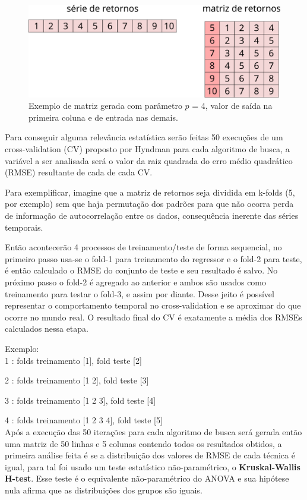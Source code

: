 \documentclass[preprint,12pt]{elsarticle}
\begin{document}
\begin{figure}[h]
	\centering\includegraphics[width=0.8\linewidth]{g4145}
	\caption{Exemplo de matriz gerada com parâmetro $p$ = 4, valor de saída na primeira coluna e de entrada nas demais.}
\end{figure}


Para conseguir alguma relevância estatística serão feitas 50 execuções de um cross-validation (CV) proposto por Hyndman \cite{hyndman} para cada algoritmo de busca, a variável a ser analisada será o valor da raiz quadrada do erro médio quadrático (RMSE) resultante de cada  de cada CV.

Para exemplificar, imagine que a matriz de retornos seja dividida em k-folds (5, por exemplo) sem que haja permutação dos padrões para que não ocorra perda de informação de autocorrelação entre os dados, consequência inerente das séries temporais. 

Então acontecerão 4 processos de treinamento/teste de forma sequencial, no primeiro passo usa-se o fold-1 para treinamento do regressor e o fold-2 para teste, é então calculado o RMSE do conjunto de teste e seu resultado é salvo. No próximo passo o fold-2 é agregado ao anterior e ambos são usados como treinamento para testar o fold-3, e assim por diante. Desse jeito é possível representar o comportamento temporal no cross-validation e se aproximar do que ocorre no mundo real. O resultado final do CV é exatamente a média dos RMSEs calculados nessa etapa.

Exemplo:\\

1 : folds treinamento [1], fold teste [2]

2 : folds treinamento [1 2], fold teste [3] 

3 : folds treinamento [1 2 3], fold teste [4] 

4 : folds treinamento [1 2 3 4], fold teste [5] \\



Após a execução das 50 iterações para cada algoritmo de busca será gerada então uma matriz de 50 linhas e 5 colunas contendo todos os resultados obtidos, a primeira análise feita é se a distribuição dos valores de RMSE de cada técnica é igual, para tal foi usado um teste estatístico não-paramétrico, o \textbf{Kruskal-Wallis H-test}. Esse teste é o equivalente não-paramétrico do ANOVA e sua hipótese nula afirma que as distribuições dos grupos são iguais.
\end{document}
